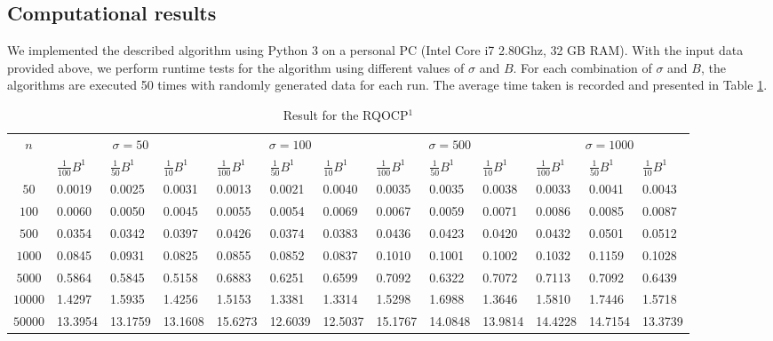 \documentclass{article}
\theoremstyle{plain}
\begin{document}
\subsection*{Computational results}
We implemented the described algorithm using Python 3 on a personal PC (Intel Core i7 2.80Ghz, 32 GB RAM). With the input data provided above, we perform runtime tests for the algorithm using different values of $\sigma$ and $B$. For each combination of $\sigma$ and $B$, the algorithms are executed 50 times with randomly generated data for each run. The average time taken is recorded and presented in Table \ref{tab1}.
\begin{table}[H]
\small
\centering
\caption{Result for the RQOCP$^1$}
\label{tab1}
\begin{tabular}{|c|lll|lll|lll|lll|}
\hline
\multirow{2}{*}{$n$}  
 & \multicolumn{3}{c|}{$\sigma=50$} & \multicolumn{3}{c|}{$\sigma=100$} & \multicolumn{3}{c|}{$\sigma=500$} &\multicolumn{3}{c|}{$\sigma=1000$}\\
\cline{2-13}
 & $\frac{1}{100} B^1$ & $\frac{1}{50} B^1$ & $\frac{1}{10}B^1$ & $\frac{1}{100}B^1$& $\frac{1}{50} B^1$ & $\frac{1}{10}B^1$& $\frac{1}{100}B^1$& $\frac{1}{50} B^1$ & $\frac{1}{10}B^1$& $\frac{1}{100}B^1$& $\frac{1}{50} B^1$ & $\frac{1}{10}B^1$\\
\hline
$50$ & 0.0019 &  0.0025 & 0.0031 & 0.0013 &  0.0021 & 0.0040& 0.0035 &  0.0035 & 0.0038& 0.0033 &  0.0041 & 0.0043 \\
\hline
$100$ & 0.0060 &  0.0050 & 0.0045 & 0.0055 &  0.0054 & 0.0069& 0.0067 &  0.0059 & 0.0071& 0.0086 &  0.0085 & 0.0087 \\
\hline
$500$ & 0.0354 &  0.0342 & 0.0397 & 0.0426 &  0.0374 & 0.0383& 0.0436 &  0.0423 & 0.0420& 0.0432 &  0.0501 & 0.0512 \\
\hline
$1000$ & 0.0845 &  0.0931 & 0.0825 & 0.0855 &  0.0852 & 0.0837& 0.1010 &  0.1001 & 0.1002& 0.1032 &  0.1159 & 0.1028 \\
\hline
$5000$ & 0.5864 &  0.5845 & 0.5158 & 0.6883 &  0.6251 & 0.6599& 0.7092 &  0.6322 & 0.7072& 0.7113 &  0.7092 & 0.6439 \\
\hline
$10000$ & 1.4297 &  1.5935 & 1.4256 & 1.5153 &  1.3381 & 1.3314& 1.5298 &  1.6988 & 1.3646& 1.5810 &  1.7446 & 1.5718 \\
\hline
$50000$ & 13.3954 &  13.1759 & 13.1608 & 15.6273 &  12.6039 & 12.5037& 15.1767 &  14.0848 & 13.9814 & 14.4228 & 14.7154  & 13.3739 \\
\hline
\end{tabular}
\end{table}
\end{document}
